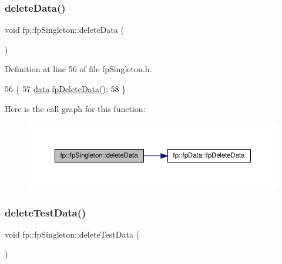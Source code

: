 \subsubsection{\texorpdfstring{delete\+Data()}{deleteData()}}
{\footnotesize\ttfamily void fp\+::fp\+Singleton\+::delete\+Data (\begin{DoxyParamCaption}{ }\end{DoxyParamCaption})\hspace{0.3cm}{\ttfamily [inline]}}



Definition at line 56 of file fp\+Singleton.\+h.


\begin{DoxyCode}
56                                     \{
57                 \hyperlink{classfp_1_1fpSingleton_a2fa16ac6a0f66641749032eeee61b8e9}{data}.\hyperlink{classfp_1_1fpData_a44df119acad6c339966d67f2c634a369}{fpDeleteData}();
58             \}
\end{DoxyCode}
Here is the call graph for this function\+:\nopagebreak
\begin{figure}[H]
\begin{center}
\leavevmode
\includegraphics[width=350pt]{classfp_1_1fpSingleton_a204b85f9d08ca711ca6620b5e020cc1c_cgraph}
\end{center}
\end{figure}
\mbox{\label{classfp_1_1fpSingleton_aa4ac02c580b06ba16ed0160ec694438d}} 
\subsubsection{\texorpdfstring{delete\+Test\+Data()}{deleteTestData()}}
{\footnotesize\ttfamily void fp\+::fp\+Singleton\+::delete\+Test\+Data (\begin{DoxyParamCaption}{ }\end{DoxyParamCaption})\hspace{0.3cm}{\ttfamily [inline]}}



